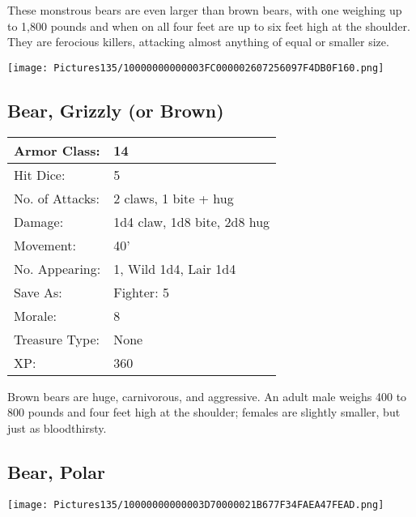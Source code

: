 \documentclass[a4paper,twoside,openany,10pt]{book}
\begin{document}
\begin{multicols}{2}
These monstrous bears are even larger than brown bears, with one weighing up to 1,800 pounds and when on all four feet are up to six feet high at the shoulder. They are ferocious killers, attacking almost anything of equal or smaller size.

\begin{center}
	\texttt{[image: Pictures135/10000000000003FC000002607256097F4DB0F160.png]}
\end{center}

\subsection*{Bear, Grizzly (or Brown)}\label{bear-grizzly-or-brown}

\begin{tabularx}{0.48\textwidth}{@{}lX@{}}
Armor Class: & 14 \\\hline
Hit Dice: & 5 \\\hline
No. of Attacks: & 2 claws, 1 bite + hug \\\hline
Damage: & 1d4 claw, 1d8 bite, 2d8 hug \\\hline
Movement: & 40' \\\hline
No. Appearing: & 1, Wild 1d4, Lair 1d4 \\\hline
Save As: & Fighter: 5 \\\hline
Morale: & 8 \\\hline
Treasure Type: & None \\\hline
XP: & 360 \\\hline
\end{tabularx}

Brown bears are huge, carnivorous, and aggressive. An adult male weighs 400 to 800 pounds and four feet high at the shoulder; females are slightly smaller, but just as bloodthirsty.

\subsection*{Bear, Polar}\label{bear-polar}


\begin{center}
	\texttt{[image: Pictures135/10000000000003D70000021B677F34FAEA47FEAD.png]}
\end{center}


\end{multicols}
\end{document}
